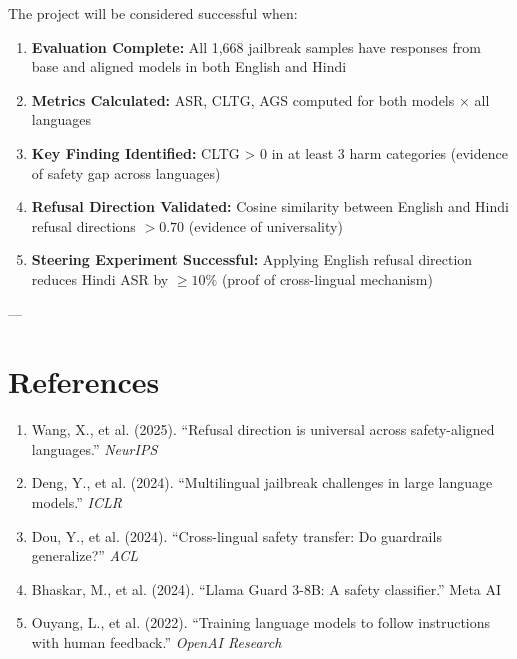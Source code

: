 \documentclass[11pt,a4paper]{article}
\begin{document}
The project will be considered successful when:

\begin{enumerate}
    \item[\checkmark] \textbf{Evaluation Complete:} All 1,668 jailbreak samples have responses from base and aligned models in both English and Hindi

    \item[\checkmark] \textbf{Metrics Calculated:} ASR, CLTG, AGS computed for both models × all languages

    \item[\checkmark] \textbf{Key Finding Identified:} CLTG > 0 in at least 3 harm categories (evidence of safety gap across languages)

    \item[\checkmark] \textbf{Refusal Direction Validated:} Cosine similarity between English and Hindi refusal directions $> 0.70$ (evidence of universality)

    \item[\checkmark] \textbf{Steering Experiment Successful:} Applying English refusal direction reduces Hindi ASR by $\geq 10\%$ (proof of cross-lingual mechanism)
\end{enumerate}

---

\section{References}

\begin{enumerate}
    \item Wang, X., et al. (2025). ``Refusal direction is universal across safety-aligned languages.'' \textit{NeurIPS}
    
    \item Deng, Y., et al. (2024). ``Multilingual jailbreak challenges in large language models.'' \textit{ICLR}
    
    \item Dou, Y., et al. (2024). ``Cross-lingual safety transfer: Do guardrails generalize?'' \textit{ACL}
    
    \item Bhaskar, M., et al. (2024). ``Llama Guard 3-8B: A safety classifier.'' Meta AI
    
    \item Ouyang, L., et al. (2022). ``Training language models to follow instructions with human feedback.'' \textit{OpenAI Research}
\end{enumerate}
\end{document}
